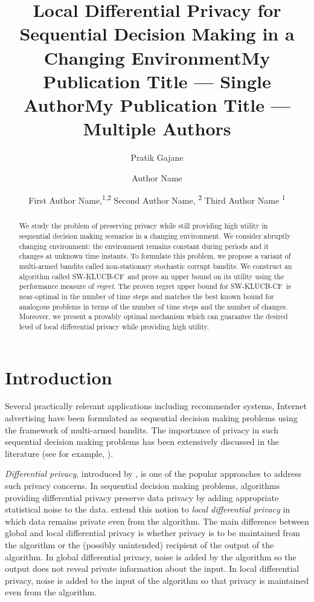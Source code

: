 \documentclass[letterpaper]{article} %
\title{Local Differential Privacy for Sequential Decision Making in a Changing Environment}
\author{
Pratik Gajane
}
\title{My Publication Title --- Single Author}
\author {
Author Name
}
\title{My Publication Title --- Multiple Authors}
\author {
First Author Name,\textsuperscript{\rm 1,\rm 2}
Second Author Name, \textsuperscript{\rm 2}
Third Author Name \textsuperscript{\rm 1}
}
\newcommand{\SWKLUCBCF}{\textsc{SW-KLUCB-CF}}
\begin{document}
\maketitle

\begin{abstract}
We study the problem of preserving privacy while still providing high utility in sequential decision making scenarios in a changing environment.  We consider abruptly changing environment: the environment remains constant during periods and it changes at unknown time instants. %
To formulate this problem, we propose a variant of multi-armed bandits called non-stationary stochastic corrupt bandits.
We construct an algorithm called \SWKLUCBCF \ and prove an upper bound on its utility using the performance measure of \textit{regret}. The proven regret upper bound for \SWKLUCBCF \ is near-optimal in the number of time steps and matches the best known bound for analogous problems in terms of the number of time steps and the number of changes. Moreover, we present a provably optimal mechanism which can guarantee the desired level of local differential privacy while providing high utility.
\end{abstract}

\section{Introduction}
Several practically relevant applications including recommender systems, Internet advertising have been formulated as sequential decision making problems using the framework of multi-armed bandits. The importance of privacy in such sequential decision making problems has been extensively discussed in the literature (see for example, %
\citet{DBLP:conf/nips/ThakurtaS13,DBLP:conf/uai/MishraT15,tossou:aaai2016}).

\textit{Differential privacy}, introduced by \citet{Dwork06calibratingnoise}, is one of the popular approaches to address such privacy concerns.
In sequential decision making problems, algorithms providing differential privacy preserve data privacy by adding appropriate statistical noise to the data.
\citet{Duchi:2014:PAL:2700084.2666468} extend this notion to \textit{local differential privacy} in which data remains private even from the algorithm.
The main difference between global and local differential privacy is whether privacy is to be maintained from the algorithm or the (possibly unintended) recipient of the output of the algorithm. In global differential privacy, noise is added by the algorithm so the output does not reveal private information about the input. In local differential privacy, noise is added to the input of the algorithm so that privacy is maintained even from the algorithm.
\end{document}

